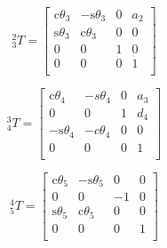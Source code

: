 \documentclass[twoside]{article}
\renewcommand{\c}{\text{c}}
\newcommand{\s}{\text{s}}
\newcommand{\T}[2]{\mbox{$_{#2}^{#1}{T}$}}
\begin{document}
\noindent\begin{minipage}{0.33\linewidth}
\begin{equation}
  \T{2}{3} =
  \begin{bmatrix}
    \c\theta_3 & -\s\theta_3 & 0 & a_2 \\
    \s\theta_3 &  \c\theta_3 & 0 &   0 \\
             0 &           0 & 1 &   0 \\
             0 &           0 & 0 &   1 \\
  \end{bmatrix}
\end{equation}
\end{minipage}%
\begin{minipage}{0.33\linewidth}
\begin{equation}
\T{3}{4} =
\begin{bmatrix}
  \c\theta_4 & -s\theta_4 & 0 & a_3 \\
           0 &          0 & 1 & d_4 \\
 -\s\theta_4 & -c\theta_4 & 0 &   0 \\
           0 &           0 & 0 &  1 \\
\end{bmatrix}
\end{equation}
\end{minipage}
\begin{minipage}{0.33\linewidth}
\begin{equation}
\T{4}{5} =
\begin{bmatrix}
  \c\theta_5 & -\s\theta_5 &  0 & 0 \\
           0 &           0 & -1 & 0 \\
  \s\theta_5 &  \c\theta_5 &  0 & 0 \\
           0 &           0 &  0 & 1 \\
\end{bmatrix}
\end{equation}
\end{minipage}%
\end{document}
